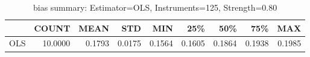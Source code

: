 \begin{table}[ht]
\centering
\caption{bias summary: Estimator=OLS, Instruments=125, Strength=0.80}
\begin{tabular}{lrrrrrrrr}
\toprule
 & COUNT & MEAN & STD & MIN & 25\% & 50\% & 75\% & MAX \\
\midrule
OLS & 10.0000 & 0.1793 & 0.0175 & 0.1564 & 0.1605 & 0.1864 & 0.1938 & 0.1985 \\
\bottomrule
\end{tabular}
\end{table}
